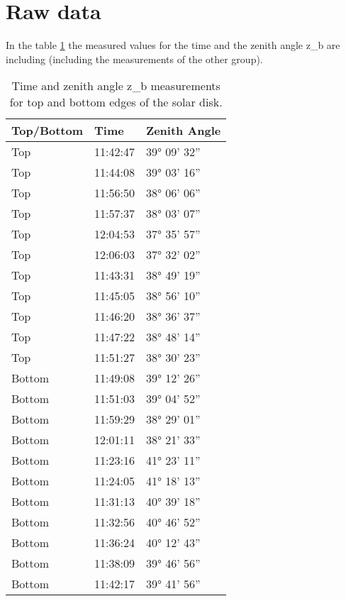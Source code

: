 \section{Raw data}

In the table \ref{tab:rawdata} the measured values for the time and the zenith angle z_b are including (including the measurements of the other group). 

\begin{table}[h!]
    \centering
    \caption{Time and zenith angle z_b measurements for top and bottom edges of the solar disk.}
    \label{tab:rawdata}
    \begin{tabular}{lll}
    \textbf{Top/Bottom} & \textbf{Time} & \textbf{Zenith Angle} \\
    \hline
    Top & 11:42:47 & 39° 09' 32'' \\
    Top & 11:44:08 & 39° 03' 16'' \\
    Top & 11:56:50 & 38° 06' 06'' \\
    Top & 11:57:37 & 38° 03' 07'' \\
    Top & 12:04:53 & 37° 35' 57'' \\
    Top & 12:06:03 & 37° 32' 02'' \\
    Top & 11:43:31 & 38° 49' 19'' \\
    Top & 11:45:05 & 38° 56' 10'' \\
    Top & 11:46:20 & 38° 36' 37'' \\
    Top & 11:47:22 & 38° 48' 14'' \\
    Top & 11:51:27 & 38° 30' 23'' \\
    \hline
    Bottom & 11:49:08 & 39° 12' 26'' \\
    Bottom & 11:51:03 & 39° 04' 52'' \\
    Bottom & 11:59:29 & 38° 29' 01'' \\
    Bottom & 12:01:11 & 38° 21' 33'' \\
    Bottom & 11:23:16 & 41° 23' 11'' \\
    Bottom & 11:24:05 & 41° 18' 13'' \\
    Bottom & 11:31:13 & 40° 39' 18'' \\
    Bottom & 11:32:56 & 40° 46' 52'' \\
    Bottom & 11:36:24 & 40° 12' 43'' \\
    Bottom & 11:38:09 & 39° 46' 56'' \\
    Bottom & 11:42:17 & 39° 41' 56'' \\
    \end{tabular}

    \end{table}

